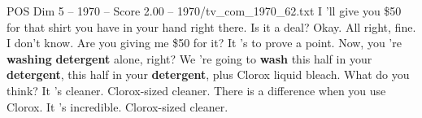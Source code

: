 \begin{textsample}{POS Dim 5 – 1970 – Score 2.00 – 1970/tv\_com\_1970\_62.txt}  \label{ex:f5_pos_055}
I 'll give you \$50 for that shirt you have in your hand right there.
Is it a deal?
Okay.
All right, fine.
I don't know.
Are you giving me \$50 for it?
It 's to prove a point.
Now, you 're \textbf{washing} \textbf{detergent} alone, right?
We 're going to \textbf{wash} this half in your \textbf{detergent}, this half in your \textbf{detergent}, plus Clorox liquid bleach.
What do you think?
It 's cleaner.
Clorox-sized cleaner.
There is a difference when you use Clorox.
It 's incredible.
Clorox-sized cleaner.

\end{textsample}
